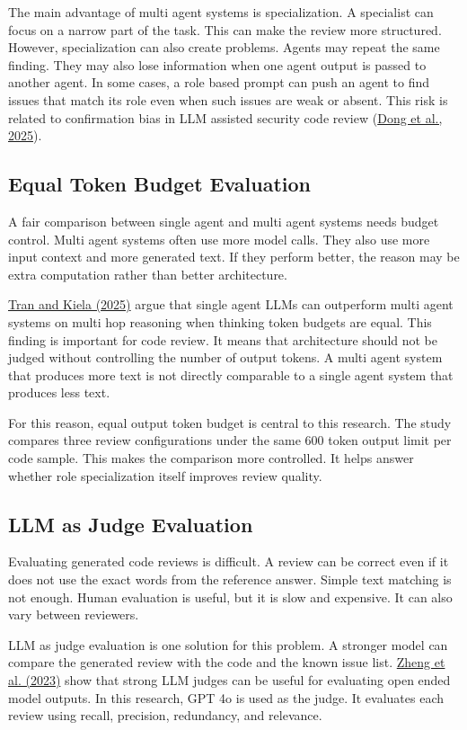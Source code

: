 \documentclass[pdflatex,sn-mathphys-num]{sn-jnl}
\newcommand{\apa}[2]{\hyperlink{cite.#1}{#2}}
\theoremstyle{thmstyleone}
\theoremstyle{thmstyletwo}
\theoremstyle{thmstylethree}
\begin{document}
The main advantage of multi agent systems is specialization. A specialist can focus on a narrow part of the task. This can make the review more structured. However, specialization can also create problems. Agents may repeat the same finding. They may also lose information when one agent output is passed to another agent. In some cases, a role based prompt can push an agent to find issues that match its role even when such issues are weak or absent. This risk is related to confirmation bias in LLM assisted security code review (\apa{dong2025}{Dong et al., 2025}).

\subsection{Equal Token Budget Evaluation}

A fair comparison between single agent and multi agent systems needs budget control. Multi agent systems often use more model calls. They also use more input context and more generated text. If they perform better, the reason may be extra computation rather than better architecture.

\apa{tran2025}{Tran and Kiela (2025)} argue that single agent LLMs can outperform multi agent systems on multi hop reasoning when thinking token budgets are equal. This finding is important for code review. It means that architecture should not be judged without controlling the number of output tokens. A multi agent system that produces more text is not directly comparable to a single agent system that produces less text.

For this reason, equal output token budget is central to this research. The study compares three review configurations under the same 600 token output limit per code sample. This makes the comparison more controlled. It helps answer whether role specialization itself improves review quality.

\subsection{LLM as Judge Evaluation}

Evaluating generated code reviews is difficult. A review can be correct even if it does not use the exact words from the reference answer. Simple text matching is not enough. Human evaluation is useful, but it is slow and expensive. It can also vary between reviewers.

LLM as judge evaluation is one solution for this problem. A stronger model can compare the generated review with the code and the known issue list. \apa{zheng2023}{Zheng et al. (2023)} show that strong LLM judges can be useful for evaluating open ended model outputs. In this research, GPT 4o is used as the judge. It evaluates each review using recall, precision, redundancy, and relevance.
\end{document}
